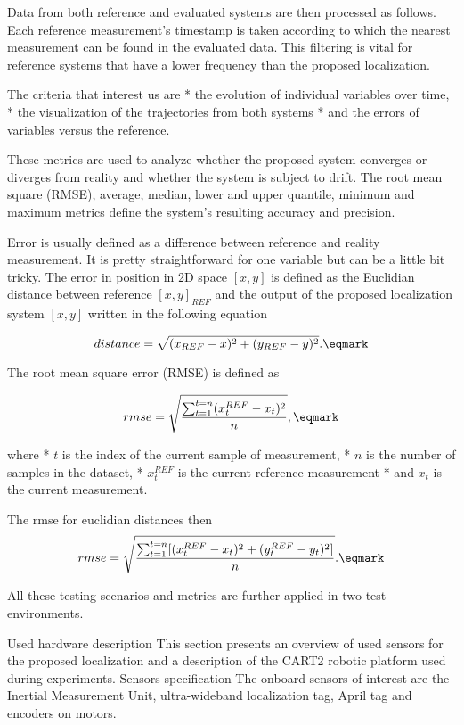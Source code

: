 Data from both reference and evaluated systems are then processed as follows. Each reference measurement's timestamp is taken according to which the nearest measurement can be found in the evaluated data. This filtering is vital for reference systems that have a lower frequency than the proposed localization.

The criteria that interest us are
\begitems
* the evolution of individual variables over time,
* the visualization of the trajectories from both systems
* and the errors of variables versus the reference.
\enditems

These metrics are used to analyze whether the proposed system converges or diverges from reality and whether the system is subject to drift. The root mean square (RMSE), average, median, lower and upper quantile, minimum and maximum metrics define the system's resulting accuracy and precision.

Error is usually defined as a difference between reference and reality measurement. It is pretty straightforward for one variable but can be a little bit tricky. The error in position in 2D space $[x, y]$ is defined as the Euclidian distance between reference $[x, y]_{REF}$ and the output of the proposed localization system $[x, y]$ written in the following equation

$$	distance = \sqrt{(x_{REF}-x)^2 + (y_{REF}-y)^2}. \eqmark$$

The root mean square error (RMSE) is defined as

$$	rmse = \sqrt{{\sum_{t=1}^{t=n}(x_t^{REF} - x_t)^2} \over {n}}, \eqmark$$

where
\begitems
* $t$ is the index of the current sample of measurement,
* $n$ is the number of samples in the dataset,
* $x_t^{REF}$ is the current reference measurement
* and $x_t$ is the current measurement.
\enditems

The rmse for euclidian distances then
$$	rmse = \sqrt{{\sum_{t=1}^{t=n}[(x_t^{REF} - x_t)^2 + (y_t^{REF} - y_t)^2]} \over {n}}. \eqmark$$

All these testing scenarios and metrics are further applied in two test environments.

\sec Used hardware description
This section presents an overview of used sensors for the proposed localization and a description of the CART2 robotic platform used during experiments.
\secc Sensors specification
The onboard sensors of interest are the Inertial Measurement Unit, ultra-wideband localization tag, April tag and encoders on motors.

